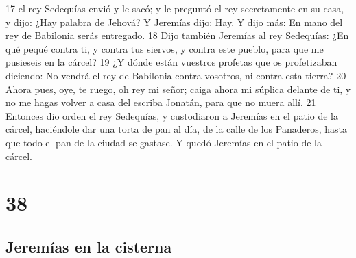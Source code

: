 17 el rey Sedequías envió y le sacó; y le preguntó el rey secretamente en su casa, y dijo: ¿Hay palabra de Jehová? Y Jeremías dijo: Hay. Y dijo más: En mano del rey de Babilonia serás entregado.
18 Dijo también Jeremías al rey Sedequías: ¿En qué pequé contra ti, y contra tus siervos, y contra este pueblo, para que me pusieseis en la cárcel?
19 ¿Y dónde están vuestros profetas que os profetizaban diciendo: No vendrá el rey de Babilonia contra vosotros, ni contra esta tierra?
20 Ahora pues, oye, te ruego, oh rey mi señor; caiga ahora mi súplica delante de ti, y no me hagas volver a casa del escriba Jonatán, para que no muera allí.
21 Entonces dio orden el rey Sedequías, y custodiaron a Jeremías en el patio de la cárcel, haciéndole dar una torta de pan al día, de la calle de los Panaderos, hasta que todo el pan de la ciudad se gastase. Y quedó Jeremías en el patio de la cárcel.

\chapter{38}

\section*{Jeremías en la cisterna}

